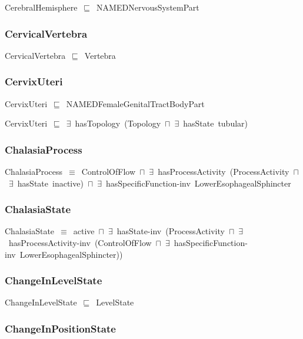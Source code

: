 \documentclass{article}
\begin{document}
CerebralHemisphere~\ensuremath{\sqsubseteq}~NAMEDNervousSystemPart~

\subsubsection*{CervicalVertebra}

CervicalVertebra~\ensuremath{\sqsubseteq}~Vertebra~

\subsubsection*{CervixUteri}

CervixUteri~\ensuremath{\sqsubseteq}~NAMEDFemaleGenitalTractBodyPart~

CervixUteri~\ensuremath{\sqsubseteq}~\ensuremath{\exists}~hasTopology~(Topology~\ensuremath{\sqcap}~\ensuremath{\exists}~hasState~tubular)~

\subsubsection*{ChalasiaProcess}

ChalasiaProcess~\ensuremath{\equiv}~ControlOfFlow~\ensuremath{\sqcap}~\ensuremath{\exists}~hasProcessActivity~(ProcessActivity~\ensuremath{\sqcap}~\ensuremath{\exists}~hasState~inactive)~\ensuremath{\sqcap}~\ensuremath{\exists}~hasSpecificFunction-inv~LowerEsophagealSphincter

\subsubsection*{ChalasiaState}

ChalasiaState~\ensuremath{\equiv}~active~\ensuremath{\sqcap}~\ensuremath{\exists}~hasState-inv~(ProcessActivity~\ensuremath{\sqcap}~\ensuremath{\exists}~hasProcessActivity-inv~(ControlOfFlow~\ensuremath{\sqcap}~\ensuremath{\exists}~hasSpecificFunction-inv~LowerEsophagealSphincter))

\subsubsection*{ChangeInLevelState}

ChangeInLevelState~\ensuremath{\sqsubseteq}~LevelState~

\subsubsection*{ChangeInPositionState}
\end{document}
